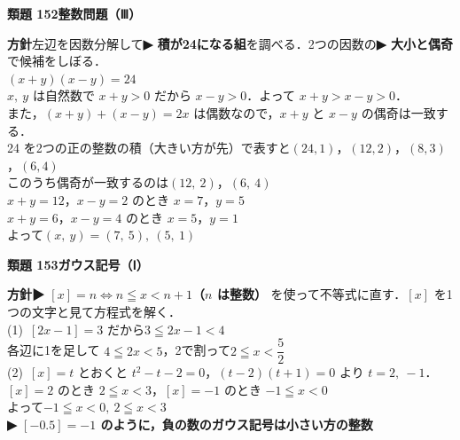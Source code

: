 \documentclass[a4paper,11pt]{ltjsarticle}
\newcommand{\ans}[2]{\Needspace{5\baselineskip}\vspace{6pt}%
  {\sffamily\bfseries 類題 #1\quad #2}\par}
\newcommand{\point}[1]{\textsf{\bfseries ▶ #1}}
\begin{document}
\ans{152}{整数問題（Ⅲ）}
\begin{kai}
\textbf{方針}\quad 左辺を因数分解して\point{積が24になる組}を調べる．2つの因数の\point{大小と偶奇}で候補をしぼる．\\[2pt]
$(x+y)(x-y)=24$\\
$x,\ y$ は自然数で $x+y>0$ だから $x-y>0$．よって $x+y>x-y>0$．\\
また，$(x+y)+(x-y)=2x$ は偶数なので，$x+y$ と $x-y$ の偶奇は一致する．\\[2pt]
24 を2つの正の整数の積（大きい方が先）で表すと\quad $(24,1)$，$(12,2)$，$(8,3)$，$(6,4)$\\
このうち偶奇が一致するのは\quad $(12,\ 2)$，$(6,\ 4)$\\[2pt]
$x+y=12$，$x-y=2$ のとき $x=7$，$y=5$\\
$x+y=6$，$x-y=4$ のとき $x=5$，$y=1$\\
よって\quad $(x,\ y)=(7,\ 5),\ (5,\ 1)$
\end{kai}

\ans{153}{ガウス記号（Ⅰ）}
\begin{kai}
\textbf{方針}\quad \point{$[x]=n\iff n\leqq x<n+1$（$n$ は整数）} を使って不等式に直す．$[x]$ を1つの文字と見て方程式を解く．\\[2pt]
(1)\ $[2x-1]=3$ だから\quad $3\leqq2x-1<4$\\
\hspace*{1.5em}各辺に1を足して $4\leqq2x<5$，2で割って\quad $2\leqq x<\dfrac52$\\[2pt]
(2)\ $[x]=t$ とおくと $t^2-t-2=0$，\quad $(t-2)(t+1)=0$ より $t=2,\ -1$．\\
\hspace*{1.5em}$[x]=2$ のとき $2\leqq x<3$，\quad $[x]=-1$ のとき $-1\leqq x<0$\\
\hspace*{1.5em}よって\quad $-1\leqq x<0,\ 2\leqq x<3$\\
\hspace*{1.5em}\point{$[-0.5]=-1$ のように，負の数のガウス記号は小さい方の整数}
\end{kai}
\end{document}
